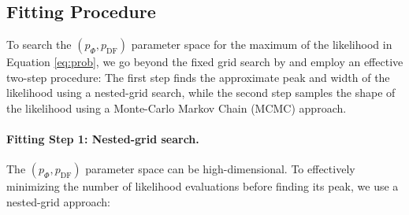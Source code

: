 \subsection{Fitting Procedure} \label{sec:fitting}

To search the $(p_\Phi,p_\text{DF})$ parameter space for the maximum of the likelihood in Equation \ref{eq:prob}, we go beyond the fixed grid search by \citet{2013ApJ...779..115B} and employ an effective two-step procedure: The first step finds the approximate peak and width of the likelihood using a nested-grid search, while the second step samples the shape of the likelihood using a Monte-Carlo Markov Chain (MCMC) approach.

\paragraph{Fitting Step 1: Nested-grid search.} The $(p_\Phi,p_\text{DF})$ parameter space can be high-dimensional. To effectively minimizing the number of likelihood evaluations before finding its peak, we use a nested-grid approach:

